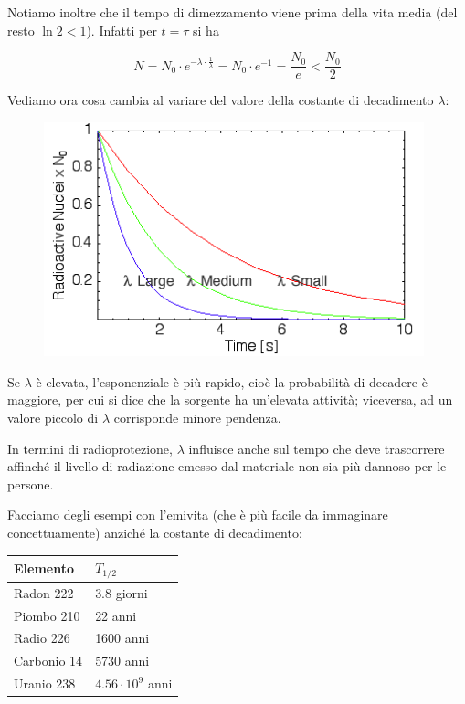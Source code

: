 
Notiamo inoltre che il tempo di dimezzamento viene prima della vita media (del resto $\ln 2 < 1$). Infatti per $t=\tau$ si ha

$$N=N_0 \cdot e^{-\lambda \cdot \frac{1}{\lambda}}
=N_0 \cdot e^{-1}=\frac{N_0}{e}<\frac{N_0}{2}$$



Vediamo ora cosa cambia al variare del valore della costante di decadimento $\lambda$:

\begin{figure}[H]
    \centering
    \includegraphics[width=11cm]{immagini/legge_decadimento_radioattivo_2.png}
\end{figure}

Se $\lambda$ è elevata, l'esponenziale è più rapido, cioè la probabilità di decadere è maggiore, per cui si dice che la sorgente ha un'elevata attività; viceversa, ad un valore piccolo di $\lambda$ corrisponde minore pendenza.

In termini di radioprotezione, $\lambda$ influisce anche sul tempo che deve trascorrere affinché il livello di radiazione emesso dal materiale non sia più dannoso per le persone.

Facciamo degli esempi con l'emivita (che è più facile da immaginare concettuamente) anziché la costante di decadimento:


\begin{center}
    \begin{tabular}{|l|l|}
        \hline
        Elemento & $T_{1/2}$\\
        \hline
        Radon 222 & 3.8 giorni\\
        \hline
        Piombo 210 & 22 anni\\
        \hline
        Radio 226 & 1600 anni\\
        \hline
        Carbonio 14 & 5730 anni\\
        \hline
        Uranio 238 & $4.56 \cdot 10^9$ anni\\
        \hline
    \end{tabular}
\end{center}

